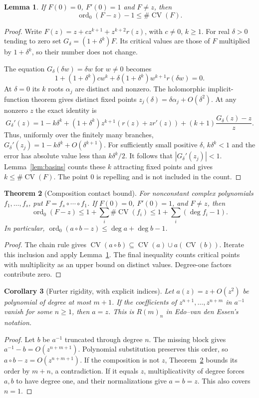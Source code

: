 \documentclass[11pt]{article}
\newtheorem{theorem}{Theorem}
\newtheorem{lemma}[theorem]{Lemma}
\newtheorem{corollary}[theorem]{Corollary}
\DeclareMathOperator{\CV}{CV}
\DeclareMathOperator{\ord}{ord}
\begin{document}
\begin{lemma}\label{lem:contact}
If $F(0)=0$, $F'(0)=1$ and $F\ne z$, then
\[
 \ord_0(F-z)-1\leq\#\CV(F).
\]
\end{lemma}
\begin{proof}
Write $F(z)=z+c z^{k+1}+z^{k+2}r(z)$, with $c\ne0$, $k\geq1$.
For real $\delta>0$ tending to zero set
$G_\delta=(1+\delta^k)F$. Its critical values are those of $F$ multiplied
by $1+\delta^k$, so their number does not change.

The equation $G_\delta(\delta w)=\delta w$ for $w\ne0$ becomes
\[
 1+(1+\delta^k)c w^k+
 \delta(1+\delta^k)w^{k+1}r(\delta w)=0.
\]
At $\delta=0$ its $k$ roots $\alpha_j$ are distinct and nonzero.
The holomorphic implicit-function theorem gives distinct fixed points
$z_j(\delta)=\delta\alpha_j+O(\delta^2)$. At any nonzero $z$ the exact
identity is
\[
 G_\delta'(z)=1-k\delta^k+
 (1+\delta^k)z^{k+1}(r(z)+zr'(z))
 +(k+1)\frac{G_\delta(z)-z}{z}.
\]
Thus, uniformly over the finitely many branches,
$G_\delta'(z_j)=1-k\delta^k+O(\delta^{k+1})$.
For sufficiently small positive $\delta$, $k\delta^k<1$ and the error has
absolute value less than $k\delta^k/2$. It follows that
$|G_\delta'(z_j)|<1$. Lemma~\ref{lem:basins} counts these $k$ attracting
fixed points and gives $k\leq\#\CV(F)$. The point $0$ is repelling and
is not included in the count.
\end{proof}

\begin{theorem}[Composition contact bound]\label{thm:composition}
For nonconstant complex polynomials $f_1,\ldots,f_s$, put
$F=f_s\circ\cdots\circ f_1$. If $F(0)=0$, $F'(0)=1$, and $F\ne z$, then
\[
 \ord_0(F-z)\leq1+\sum_i\#\CV(f_i)
 \leq1+\sum_i(\deg f_i-1).
\]
In particular, $\ord_0(a\circ b-z)\leq\deg a+\deg b-1$.
\end{theorem}
\begin{proof}
The chain rule gives
$\CV(a\circ b)\subseteq\CV(a)\cup a(\CV(b))$.
Iterate this inclusion and apply Lemma~\ref{lem:contact}.
The final inequality counts critical points with multiplicity as an upper
bound on distinct values. Degree-one factors contribute zero.
\end{proof}

\begin{corollary}[Furter rigidity, with explicit indices]\label{cor:rigidity}
Let $a(z)=z+O(z^2)$ be polynomial of degree at most $m+1$.
If the coefficients of $z^{n+1},\ldots,z^{n+m}$ in $a^{-1}$ vanish for
some $n\geq1$, then $a=z$. This is $R(m)_n$ in Edo--van den Essen's notation.
\end{corollary}
\begin{proof}
Let $b$ be $a^{-1}$ truncated through degree $n$. The missing block gives
$a^{-1}-b=O(z^{n+m+1})$. Polynomial substitution preserves this order,
so $a\circ b-z=O(z^{n+m+1})$. If the composition is not $z$,
Theorem~\ref{thm:composition} bounds its order by $m+n$, a contradiction.
If it equals $z$, multiplicativity of degree forces $a,b$ to have degree
one, and their normalizations give $a=b=z$. This also covers $n=1$.
\end{proof}
\end{document}
